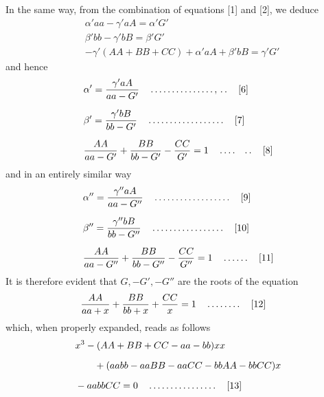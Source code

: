 In the same way, from the combination of equations [1] and [2], we deduce
\[
\begin{aligned}
&\alpha'aa-\gamma'aA=\alpha'G'\\[6pt]
&\beta'bb-\gamma'bB=\beta'G'\\[6pt]
&-\gamma'(AA+BB+CC)+\alpha'aA+\beta'bB=\gamma'G'
\end{aligned}
\]
and hence
\[
\begin{aligned}
&\alpha'{}=\frac{\gamma'aA}{aa-G'}\quad\mathinner{.\,.\,.\,.\,.\,.\,.\,.\,.\,.\,.\,.\,.\,.\,.\,,\,.\,.}\quad\text{[6]}\\[6pt]
&\beta'{}=\frac{\gamma'bB}{bb-G'}\quad\mathinner{.\,.\,.\,.\,.\,.\,.\,.\,.\,.\,.\,.\,.\,.\,.\,.\,.\,.}\quad\text{[7]}\\[6pt]
&\frac{AA}{aa-G'}+\frac{BB}{bb-G'}-\frac{CC}{G'}=1\quad\mathinner{.\,.\,.\,.\quad.\,.}\quad\text{[8]}
\end{aligned}
\]
and in an entirely similar way
\[
\begin{aligned}
&\alpha''{}=\frac{\gamma''aA}{aa-G''}\quad\mathinner{.\,.\,.\,.\,.\,.\,.\,.\,.\,.\,.\,.\,.\,.\,.\,.\,.\,.}\quad\text{[9]}\\[6pt]
&\beta''{}=\frac{\gamma''bB}{bb-G''}\quad\mathinner{.\,.\,.\,.\,.\,.\,.\,.\,.\,.\,.\,.\,.\,.\,.\,.\,.}\quad\text{[10]}\\[6pt]
&\frac{AA}{aa-G''}+\frac{BB}{bb-G''}-\frac{CC}{G''}=1\quad\mathinner{.\,.\,.\,.\,.\,.}\quad\text{[11]}
\end{aligned}
\]
It is therefore evident that $G,-G',-G''$ are the roots of the equation
\[
\begin{aligned}
&\frac{AA}{aa+x}+\frac{BB}{bb+x}+\frac{CC}{x}=1\quad\mathinner{.\,.\,.\,.\,.\,.\,.\,.}\quad\text{[12]}
\end{aligned}
\]
which, when properly expanded, reads as follows
\[
\begin{aligned}
&x^3-(AA+BB+CC-aa-bb)xx\\[6pt]
&\qquad{}+(aabb-aaBB-aaCC-bbAA-bbCC)x\\[6pt]
&-aabbCC=0\quad\mathinner{.\,.\,.\,.\,.\,.\,.\,.\,.\,.\,.\,.\,.\,.\,.\,.}\quad\text{[13]}
\end{aligned}
\]

\clearpage
\endgroup
